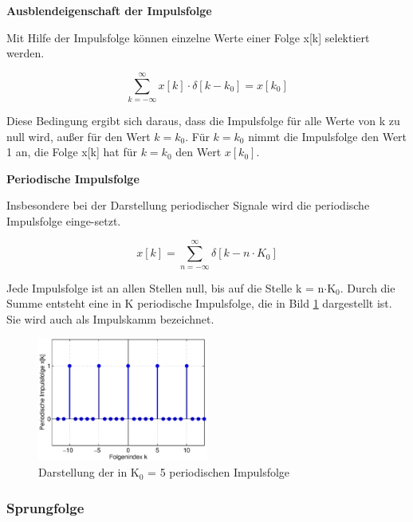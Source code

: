 \clearpage


{\selectfont
\noindent\textbf{Ausblendeigenschaft der Impulsfolge}} \smallskip

\noindent Mit Hilfe der Impulsfolge können einzelne Werte einer Folge x[k] selektiert werden. 

\begin{equation}\label{eq:threetwenty}
\sum _{k=-\infty }^{\infty }x\left[k\right]\cdot \delta \left[k-k_{0} \right] =x\left[k_{0} \right]
\end{equation}

\noindent Diese Bedingung ergibt sich daraus, dass die Impulsfolge f\"{u}r alle Werte von k zu null wird, au{\ss}er f\"{u}r den Wert $k = k{}_{0}$. F\"{u}r $k = k{}_{0}$ nimmt die Impulsfolge den Wert 1 an, die Folge x[k] hat f\"{u}r $k = k{}_{0}$ den Wert $x[k{}_{0}]$. \bigskip

{\selectfont
\noindent\textbf{Periodische Impulsfolge}} \smallskip

\noindent Insbesondere bei der Darstellung periodischer Signale wird die periodische Impulsfolge einge-setzt. 

\begin{equation}\label{eq:threetwentyone}
x\left[k\right]=\sum _{n=-\infty }^{\infty }\delta \left[k-n\cdot K_{0} \right]
\end{equation}

\noindent Jede Impulsfolge ist an allen Stellen null, bis auf die Stelle k = n$\cdot$K${}_{0}$. Durch die Summe entsteht eine in K periodische Impulsfolge, die in Bild \ref{fig:ImpulsfolgePeriodisch} dargestellt ist. Sie wird auch als Impulskamm bezeichnet.

\begin{figure}[H]
  \centerline{\includegraphics[width=0.5\textwidth]{Kapitel3/Bilder/image8.eps}}
  \caption{Darstellung der in K${}_{0}$ = 5 periodischen Impulsfolge}
  \label{fig:ImpulsfolgePeriodisch}
\end{figure}

\subsubsection{Sprungfolge}

